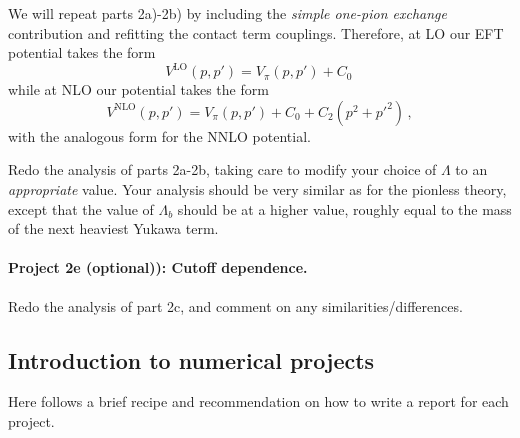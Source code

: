 \documentclass[%
oneside,                 %
final,                   %
10pt]{article}
\begin{document}
We will repeat parts 2a)-2b) by including the \emph{simple one-pion exchange}
contribution and refitting the contact term couplings. Therefore, at
LO our EFT potential takes the form
\[
V^\mathrm{LO}(p,p')= V_{\pi}(p,p') + C_0\,
\]
while at NLO our potential takes the form
\[
V^\mathrm{NLO}(p,p')= V_{\pi}(p,p') + C_0 + C_2(p^2+p'^2)\,,
\]
with the analogous form for the NNLO potential. 

Redo the analysis of parts 2a-2b, taking care to modify your choice of
$\Lambda$ to an \emph{appropriate} value.  Your analysis should be very
similar as for the pionless theory, except that the value of
$\Lambda_b$ should be at a higher value, roughly equal to the mass of
the next heaviest Yukawa term.

\paragraph{Project 2e (optional)): Cutoff dependence.}
Redo the analysis of part 2c, and comment on any similarities/differences. 


\subsection*{Introduction to numerical projects}

Here follows a brief recipe and recommendation on how to write a report for each
project.
\end{document}
